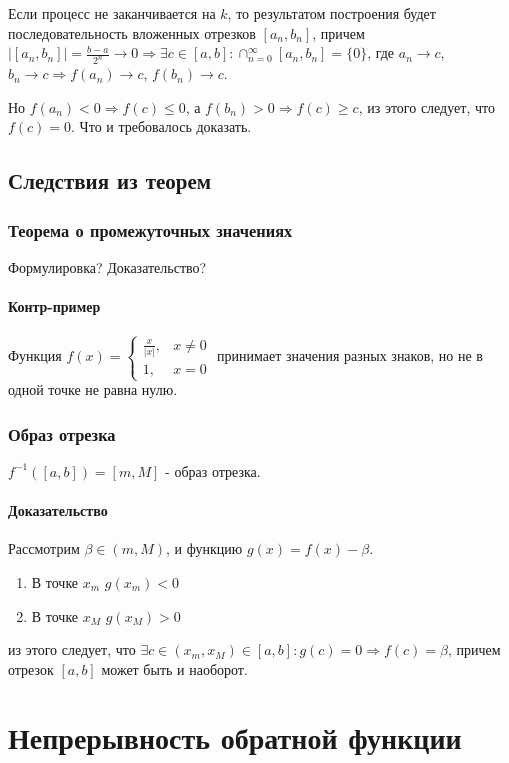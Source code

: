 \documentclass[10pt]{article}
\begin{document}
		Если процесс не заканчивается на $k$, то результатом построения будет последовательность вложенных отрезков $[a_n, b_n]$, причем $|[a_n, b_n]| = \frac{b-a}{2^n} \to 0 \Rightarrow \exists c \in [a,b] : \cap_{n=0}^\infty[a_n, b_n] = \{0\}$, где $a_n \to c$, $b_n \to c \Rightarrow f(a_n) \to c$, $f(b_n) \to c$.
		
		Но $f(a_n) < 0 \Rightarrow f(c) \leq 0$, а $f(b_n) > 0 \Rightarrow f(c) \geq c$, из этого следует, что $f(c) = 0$. Что и требовалось доказать.
		
		\subsection{Следствия из теорем}
			\subsubsection{Теорема о промежуточных значениях}
			Формулировка? Доказательство? %
			\paragraph{Контр-пример} Функция $f(x) = \begin{cases}
				\frac{x}{|x|}, &x \neq 0 \\
				1, & x = 0
			\end{cases}$ принимает значения разных знаков, но не в одной точке не равна нулю.
			\subsubsection{Образ отрезка}
			$f^{-1}([a, b]) = [m, M]$ - образ отрезка.
			\paragraph{Доказательство} 
			Рассмотрим $\beta \in (m, M)$, и функцию $g(x) = f(x)-\beta$.
			\begin{enumerate}
				\item В точке $x_m$ $g(x_m) < 0$
				\item В точке $x_M$ $g(x_M) > 0$
			\end{enumerate} из этого следует, что $\exists c \in (x_m, x_M) \in [a, b] : g(c) = 0 \Rightarrow f(c) = \beta$, причем отрезок $[a,b]$ может быть и наоборот.
			
	\section{Непрерывность обратной функции}
\end{document}
